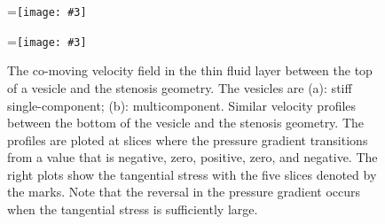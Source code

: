 \documentclass[twoside,twocolumn,9pt]{article}
\newcommand{\subfigimg}[3][,]{%
  \setbox1=\hbox{\texttt{[image: \#3]}}%
  \leavevmode\rlap{\usebox1}%
  \rlap{\hspace*{0pt}\raisebox{\dimexpr\ht1-0\baselineskip}{\bf
  \normalsize #2}}%
  \phantom{\usebox1}%
}
\begin{document}
\begin{figure}
  \centering
  \subfigimg[width=\columnwidth]{(a)}{figures/SC_top.pdf}
  \subfigimg[width=\columnwidth]{(b)}{figures/MCp5_top.pdf}
  \caption{\label{fig:BLvelocities} \small The co-moving velocity field
  in the thin fluid layer between the top of a vesicle and the stenosis
  geometry. The vesicles are (a): stiff single-component; (b):
  multicomponent. Similar velocity profiles between the bottom of the
  vesicle and the stenosis geometry. The profiles are ploted at slices
  where the pressure gradient transitions from a value that is negative,
  zero, positive, zero, and negative. The right plots show the
  tangential stress with the five slices denoted by the marks. Note that
  the reversal in the pressure gradient occurs when the tangential
  stress is sufficiently large.}
\end{figure}


\end{document}
